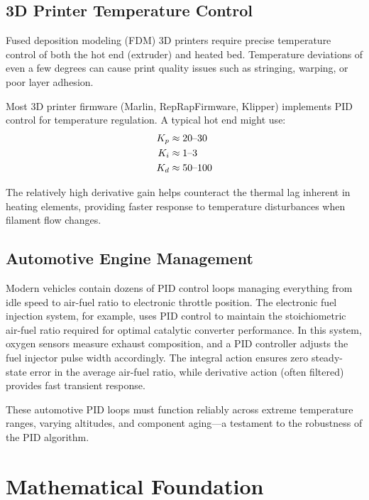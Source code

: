 \subsection{3D Printer Temperature Control}

Fused deposition modeling (FDM) 3D printers require precise temperature control of both the hot end (extruder) and heated bed. Temperature deviations of even a few degrees can cause print quality issues such as stringing, warping, or poor layer adhesion.

Most 3D printer firmware (Marlin, RepRapFirmware, Klipper) implements PID control for temperature regulation. A typical hot end might use:
\begin{align}
K_p &\approx 20\text{--}30 \\
K_i &\approx 1\text{--}3 \\
K_d &\approx 50\text{--}100
\end{align}

The relatively high derivative gain helps counteract the thermal lag inherent in heating elements, providing faster response to temperature disturbances when filament flow changes.

\subsection{Automotive Engine Management}

Modern vehicles contain dozens of PID control loops managing everything from idle speed to air-fuel ratio to electronic throttle position. The electronic fuel injection system, for example, uses PID control to maintain the stoichiometric air-fuel ratio required for optimal catalytic converter performance. In this system, oxygen sensors measure exhaust composition, and a PID controller adjusts the fuel injector pulse width accordingly. The integral action ensures zero steady-state error in the average air-fuel ratio, while derivative action (often filtered) provides fast transient response.

These automotive PID loops must function reliably across extreme temperature ranges, varying altitudes, and component aging---a testament to the robustness of the PID algorithm.


\section{Mathematical Foundation}

